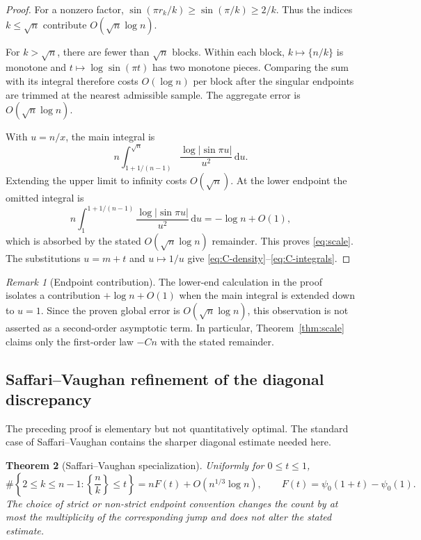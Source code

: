 \documentclass[11pt]{amsart}
\numberwithin{equation}{section}
\newtheorem{theorem}{Theorem}[section]
\theoremstyle{definition}
\theoremstyle{remark}
\newtheorem{remark}[theorem]{Remark}
\newcommand{\dd}{\,\mathrm d}
\begin{document}
\begin{proof}
For a nonzero factor,
\(\sin(\pi r_k/k)\geq\sin(\pi/k)\geq2/k\).  Thus the indices
\(k\leq\sqrt n\) contribute \(O(\sqrt n\log n)\).

For \(k>\sqrt n\), there are fewer than \(\sqrt n\) blocks.  Within each
block, \(k\mapsto\{n/k\}\) is monotone and
\(t\mapsto\log\sin(\pi t)\) has two monotone pieces.  Comparing the sum
with its integral therefore costs \(O(\log n)\) per block after the
singular endpoints are trimmed at the nearest admissible sample.  The
aggregate error is \(O(\sqrt n\log n)\).

With \(u=n/x\), the main integral is
\[
 n\int_{1+1/(n-1)}^{\sqrt n}
 \frac{\log|\sin\pi u|}{u^2}\dd u.
\]
Extending the upper limit to infinity costs \(O(\sqrt n)\).  At the lower endpoint the omitted integral is
\[
 n\int_1^{1+1/(n-1)}\frac{\log|\sin\pi u|}{u^2}\dd u
 =-\log n+O(1),
\]
which is absorbed by the stated \(O(\sqrt n\log n)\) remainder.  This proves
\eqref{eq:scale}.  The substitutions \(u=m+t\) and \(u\mapsto1/u\) give
\eqref{eq:C-density}--\eqref{eq:C-integrals}.
\end{proof}

\begin{remark}[Endpoint contribution]\label{rem:endpoint-log}
The lower-end calculation in the proof isolates a contribution
\(+\log n+O(1)\) when the main integral is extended down to \(u=1\).
Since the proven global error is \(O(\sqrt n\log n)\), this observation is
not asserted as a second-order asymptotic term.  In particular,
Theorem~\ref{thm:scale} claims only the first-order law \(-Cn\) with the
stated remainder.
\end{remark}

\subsection{Saffari--Vaughan refinement of the diagonal discrepancy}

The preceding proof is elementary but not quantitatively optimal.  The
standard case of Saffari--Vaughan \cite[Theorem~1 and Corollary~1.1]{SaffariVaughan1977}
contains the sharper diagonal estimate needed here.

\begin{theorem}[Saffari--Vaughan specialization]\label{thm:SV-specialization}
Uniformly for \(0\le t\le1\),
\begin{equation}\label{eq:SV-specialization}
 \#\left\{2\le k\le n-1:\left\{\frac nk\right\}\le t\right\}
 =nF(t)+O\!\left(n^{1/3}\log n\right),
 \qquad F(t)=\psi_0(1+t)-\psi_0(1).
\end{equation}
The choice of strict or non-strict endpoint convention changes the count by
at most the multiplicity of the corresponding jump and does not alter the
stated estimate.
\end{theorem}
\end{document}
